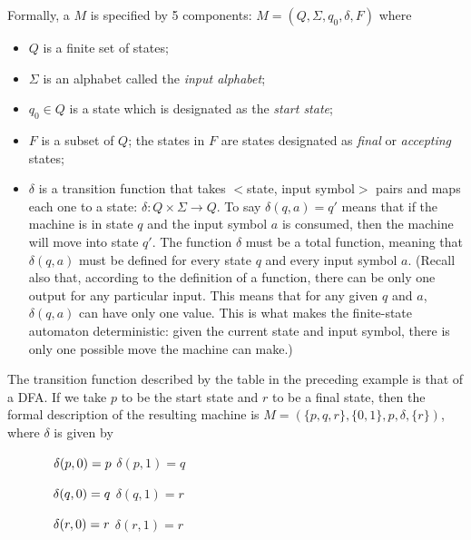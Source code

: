 \begin{definition}
Formally,
a  $M$ is specified by 5 components:
$M=(Q, \Sigma, q_0, \delta, F)$ where
\begin{itemize} 
\item $Q$ is a finite set of states; 
\item $\Sigma$ is an alphabet called the {\em input alphabet}; 
\item $q_0 \in Q$ is a state which is designated as the {\em start state}; 
\item $F$ is a subset of $Q$; the states in $F$ are states designated as 
{\em final} or {\em accepting}  states; 
\item $\delta$ is a transition function that takes 
$<$state, input symbol$>$ pairs and maps each one to a state: $\delta : Q \times
\Sigma \rightarrow Q$.  To say
$\delta(q,a) = q'$ means that
if the machine is in state $q$ and the input symbol $a$ is consumed, then the
machine will move into state $q'$.  The function $\delta$ must be a total
function, meaning that $\delta(q,a)$ must be defined for every state $q$ and
every input symbol $a$.  (Recall also that, according to the definition of a
function, there can be only one output for any particular input.  This means
that for any given $q$ and $a$, $\delta(q,a)$ can have only one value.  This is
what makes the finite-state automaton deterministic: given the current state and
input symbol, there is only one possible move the machine can make.)
\end{itemize}
\end{definition}

\begin{example}
The transition function described by the table in the preceding example is that of
a DFA.  
If we take $p$ to be the start state and $r$ to be a final state, then the
formal description  of the resulting machine 
is $M= (\{p,q,r\}, \{0,1\}, p, \delta, \{r\})$, where $\delta$
is given by

\medskip

$\hspace{0.5in}\delta(p,0)=p$ \hspace{1.5in} $\delta(p,1)=q$

$\hspace{0.5in}\delta(q,0)=q$ \hspace{1.5in} $\delta(q,1)=r$

$\hspace{0.5in}\delta(r,0)=r$ \hspace{1.5in} $\delta(r,1)=r$
\end{example}
\smallskip

